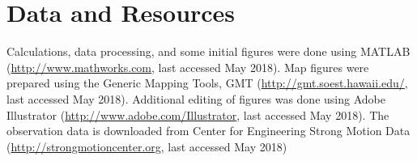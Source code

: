 
\section{Data and Resources}

Calculations, data processing, and some initial figures were done using MATLAB (\url{http://www.mathworks.com}, last accessed May 2018). Map figures were prepared using the Generic Mapping Tools, GMT (\url{http://gmt.soest.hawaii.edu/}, last accessed May 2018). Additional editing of figures was done using Adobe Illustrator (\url{http://www.adobe.com/Illustrator‎}, last accessed May 2018). The observation data is downloaded from Center for Engineering Strong Motion Data (\url{http://strongmotioncenter.org}, last accessed May 2018)